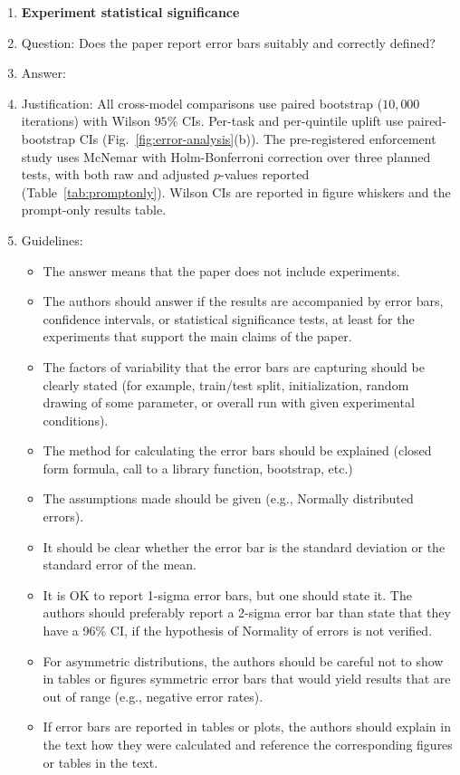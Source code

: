 \begin{enumerate}
\item {\bf Experiment statistical significance}
    \item[] Question: Does the paper report error bars suitably and correctly defined?
    \item[] Answer: \answerYes{}
    \item[] Justification: All cross-model comparisons use paired bootstrap ($10{,}000$ iterations) with Wilson $95\%$ CIs. Per-task and per-quintile uplift use paired-bootstrap CIs (Fig.~\ref{fig:error-analysis}(b)). The pre-registered enforcement study uses McNemar with Holm-Bonferroni correction over three planned tests, with both raw and adjusted $p$-values reported (Table~\ref{tab:promptonly}). Wilson CIs are reported in figure whiskers and the prompt-only results table.
    \item[] Guidelines:
    \begin{itemize}
        \item The answer \answerNA{} means that the paper does not include experiments.
        \item The authors should answer \answerYes{} if the results are accompanied by error bars, confidence intervals, or statistical significance tests, at least for the experiments that support the main claims of the paper.
        \item The factors of variability that the error bars are capturing should be clearly stated (for example, train/test split, initialization, random drawing of some parameter, or overall run with given experimental conditions).
        \item The method for calculating the error bars should be explained (closed form formula, call to a library function, bootstrap, etc.)
        \item The assumptions made should be given (e.g., Normally distributed errors).
        \item It should be clear whether the error bar is the standard deviation or the standard error of the mean.
        \item It is OK to report 1-sigma error bars, but one should state it. The authors should preferably report a 2-sigma error bar than state that they have a 96\% CI, if the hypothesis of Normality of errors is not verified.
        \item For asymmetric distributions, the authors should be careful not to show in tables or figures symmetric error bars that would yield results that are out of range (e.g., negative error rates).
        \item If error bars are reported in tables or plots, the authors should explain in the text how they were calculated and reference the corresponding figures or tables in the text.
    \end{itemize}


\end{enumerate}
